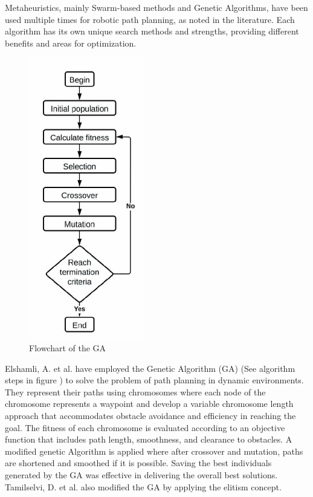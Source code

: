 Metaheuristics, mainly Swarm-based methods and Genetic Algorithms, 
have been used multiple times for robotic path planning, as noted in the literature. 
Each algorithm has its own unique search methods and strengths, providing different benefits and 
areas for optimization.
  


\begin{figure}[H]
    \centering
    \includegraphics[width=2in]{images/Chap1/GA.jpg}
    \caption{Flowchart of the GA \cite{R39}}
    \label{GA}
\end{figure}

Elshamli, A. et al. \cite{R17} have employed the Genetic Algorithm (GA) (See algorithm steps in figure ) to solve 
the problem of path planning in dynamic environments. They represent their paths using chromosomes where each node of the chromosome represents 
a waypoint and develop a variable chromosome length approach that accommodates obstacle avoidance and efficiency 
in reaching the goal. The fitness of each chromosome is evaluated according to an objective function that includes path length, smoothness, 
and clearance to obstacles. A modified genetic Algorithm is applied where after crossover and mutation, paths are 
shortened and smoothed if it is possible. Saving the best individuals generated by the GA was effective in delivering the overall best solutions.
Tamilselvi, D. et al. also modified the GA by applying the elitism concept. 

